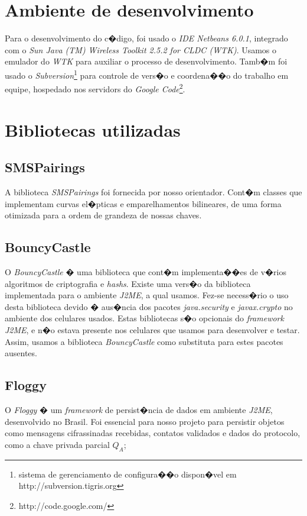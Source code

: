 \documentclass[a4paper,capchap,espacoduplo,normaltoc]{abntepusp}
\begin{document}
\section{Ambiente de desenvolvimento}
Para o desenvolvimento do c�digo, foi usado o \emph{IDE Netbeans 6.0.1}, integrado com o \emph{Sun Java (TM) Wireless Toolkit 2.5.2 for CLDC (WTK)}. Usamos o emulador do \emph{WTK} para auxiliar o processo de desenvolvimento. Tamb�m foi usado o \emph{Subversion}\footnote{sistema de gerenciamento de configura��o dispon�vel em http://subversion.tigris.org} para controle de vers�o e coordena��o do trabalho em equipe, hospedado nos servidors do \emph{Google Code}\footnote{http://code.google.com/}.
\section{Bibliotecas utilizadas}
\subsection{SMSPairings}
A biblioteca \emph{SMSPairings} foi fornecida por nosso orientador. Cont�m classes que implementam curvas el�pticas e emparelhamentos bilineares, de uma forma otimizada para a ordem de grandeza de nossas chaves.
\subsection{BouncyCastle}
O \emph{BouncyCastle} � uma biblioteca que cont�m implementa��es de v�rios algoritmos de criptografia e \emph{hashs}. Existe uma vers�o da biblioteca implementada para o ambiente \emph{J2ME}, a qual usamos. Fez-se necess�rio o uso desta biblioteca devido � aus�ncia dos pacotes \emph{java.security} e \emph{javax.crypto} no ambiente dos celulares usados. Estas bibliotecas s�o opcionais do \emph{framework J2ME}, e n�o estava presente nos celulares que usamos para desenvolver e testar. Assim, usamos a biblioteca \emph{BouncyCastle} como substituta para estes pacotes ausentes.
\subsection{Floggy}
O \emph{Floggy} � um \emph{framework} de persist�ncia de dados em ambiente \emph{J2ME}, desenvolvido no Brasil. Foi essencial para nosso projeto para persistir objetos como mensagens cifrassinadas recebidas, contatos validados e dados do protocolo, como a chave privada parcial $Q_A$;
\end{document}
